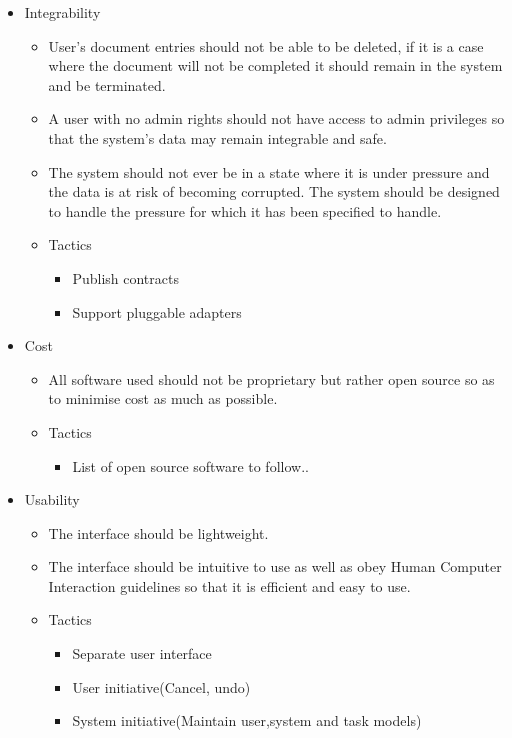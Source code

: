 \documentclass[a4paper,12pt]{article}
\begin{document}
\begin{itemize}
\begin{itemize}
		\end{itemize}
		\item Integrability
		\begin{itemize}
			\item User's document entries should not be able to be deleted, if it is a case where the document will not be completed it should remain in the system and be terminated.
			\item A user with no admin rights should not have access to admin privileges so that the system's data may remain integrable and safe.
			\item The system should not ever be in a state where it is under pressure and the data is at risk of becoming corrupted. The system should be designed to handle the pressure for which it has been specified to handle.
			
			\item Tactics
			\begin{itemize}
				\item Publish contracts
				\item Support pluggable adapters
			\end{itemize}			
		
			
		\end{itemize}
		\item Cost
		\begin{itemize}
			\item All software used should not be proprietary but rather open source so as to minimise cost as much as possible.
			
			\item Tactics
			\begin{itemize}
				\item List of open source software to follow..
			\end{itemize}			
			
		\end{itemize}
		\item Usability
		\begin{itemize}
			\item The interface should be lightweight.
			\item The interface should be intuitive to use as well as obey Human Computer Interaction guidelines so that it is efficient and easy to use.
			
			\item Tactics
			\begin{itemize}
				\item Separate user interface
				\item User initiative(Cancel, undo)
				\item System initiative(Maintain user,system and task models)
			\end{itemize}			
			
		\end{itemize}
	\end{itemize}
\end{document}
